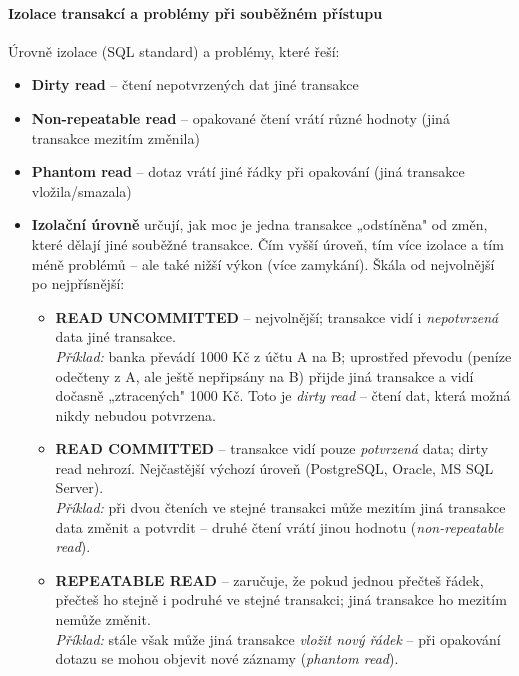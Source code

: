 \paragraph{Izolace transakcí a problémy při souběžném přístupu}
Úrovně izolace (SQL standard) a problémy, které řeší:
\begin{itemize}
  \item \textbf{Dirty read} -- čtení nepotvrzených dat jiné transakce
  \item \textbf{Non-repeatable read} -- opakované čtení vrátí různé hodnoty (jiná transakce mezitím změnila)
  \item \textbf{Phantom read} -- dotaz vrátí jiné řádky při opakování (jiná transakce vložila/smazala)
  \item \textbf{Izolační úrovně} určují, jak moc je jedna transakce „odstíněna" od změn, které
    dělají jiné souběžné transakce. Čím vyšší úroveň, tím více izolace a tím méně problémů --
    ale také nižší výkon (více zamykání). Škála od nejvolnější po nejpřísnější:

    \begin{itemize}
      \item \textbf{READ UNCOMMITTED} -- nejvolnější; transakce vidí i \textit{nepotvrzená} data
        jiné transakce. \\
        \textit{Příklad:} banka převádí 1000 Kč z účtu A na B; uprostřed převodu (peníze odečteny
        z A, ale ještě nepřipsány na B) přijde jiná transakce a vidí dočasně „ztracených" 1000 Kč.
        Toto je \textit{dirty read} -- čtení dat, která možná nikdy nebudou potvrzena.

      \item \textbf{READ COMMITTED} -- transakce vidí pouze \textit{potvrzená} data; dirty read
        nehrozí. Nejčastější výchozí úroveň (PostgreSQL, Oracle, MS SQL Server). \\
        \textit{Příklad:} při dvou čteních ve stejné transakci může mezitím jiná transakce
        data změnit a potvrdit -- druhé čtení vrátí jinou hodnotu (\textit{non-repeatable read}).

      \item \textbf{REPEATABLE READ} -- zaručuje, že pokud jednou přečteš řádek, přečteš ho
        stejně i podruhé ve stejné transakci; jiná transakce ho mezitím nemůže změnit. \\
        \textit{Příklad:} stále však může jiná transakce \textit{vložit nový řádek} -- při
        opakování dotazu se mohou objevit nové záznamy (\textit{phantom read}).


\end{itemize}
\end{itemize}
